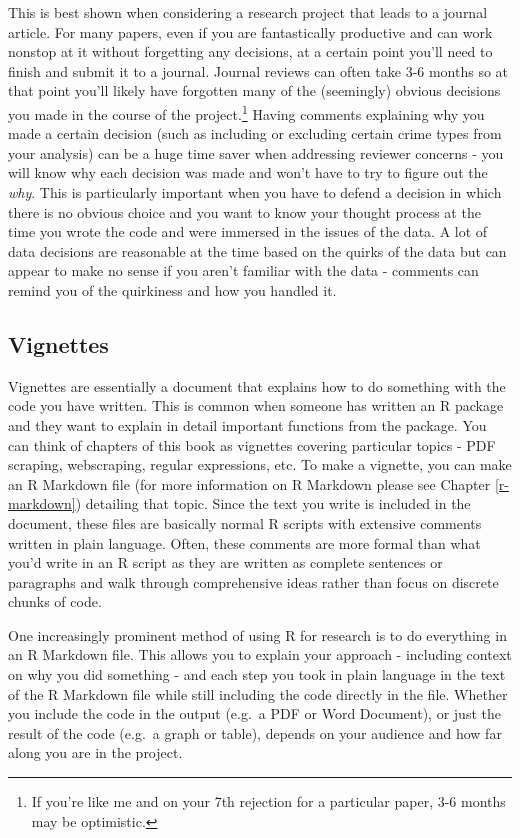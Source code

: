 \documentclass[
]{krantz}
\begin{document}
This is best shown when considering a research project that leads to a journal article. For many papers, even if you are fantastically productive and can work nonstop at it without forgetting any decisions, at a certain point you'll need to finish and submit it to a journal. Journal reviews can often take 3-6 months so at that point you'll likely have forgotten many of the (seemingly) obvious decisions you made in the course of the project.\footnote{If you're like me and on your 7th rejection for a particular paper, 3-6 months may be optimistic.} Having comments explaining why you made a certain decision (such as including or excluding certain crime types from your analysis) can be a huge time saver when addressing reviewer concerns - you will know why each decision was made and won't have to try to figure out the \emph{why}. This is particularly important when you have to defend a decision in which there is no obvious choice and you want to know your thought process at the time you wrote the code and were immersed in the issues of the data. A lot of data decisions are reasonable at the time based on the quirks of the data but can appear to make no sense if you aren't familiar with the data - comments can remind you of the quirkiness and how you handled it.

\hypertarget{vignettes}{%
\subsection{Vignettes}\label{vignettes}}

Vignettes are essentially a document that explains how to do something with the code you have written. This is common when someone has written an R package and they want to explain in detail important functions from the package. You can think of chapters of this book as vignettes covering particular topics - PDF scraping, webscraping, regular expressions, etc. To make a vignette, you can make an R Markdown file (for more information on R Markdown please see Chapter \ref{r-markdown}) detailing that topic. Since the text you write is included in the document, these files are basically normal R scripts with extensive comments written in plain language. Often, these comments are more formal than what you'd write in an R script as they are written as complete sentences or paragraphs and walk through comprehensive ideas rather than focus on discrete chunks of code.

One increasingly prominent method of using R for research is to do everything in an R Markdown file. This allows you to explain your approach - including context on why you did something - and each step you took in plain language in the text of the R Markdown file while still including the code directly in the file. Whether you include the code in the output (e.g.~a PDF or Word Document), or just the result of the code (e.g.~a graph or table), depends on your audience and how far along you are in the project.
\end{document}
